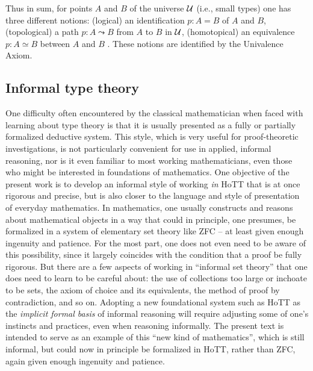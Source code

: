 {Thus in sum, for points  $A$ and $B$ of the universe $\mathcal{U}$ (i.e., small types) one has three different notions: (logical) an identification $p:A=B$ of $A$ and $B$, (topological) a path $p:A \leadsto B$ from $A$ to $B$ in $\mathcal{U}$, (homotopical) an equivalence $p:A\simeq B$ between $A$ and $B$ .  These notions are identified by the Univalence Axiom.


\subsection*{Informal type theory}

One difficulty often encountered by the classical mathematician when faced with learning about type theory is that it is usually presented as a fully or partially formalized deductive system.  This style, which is very useful for proof-theoretic investigations, is not particularly convenient for use in applied, informal reasoning, nor is it even familiar to most working mathematicians, even those who might be interested in foundations of mathematics.  One objective of the present work is to develop an informal style of working \emph{in} HoTT that is at once rigorous and precise, but is also closer to the language and style of presentation of everyday mathematics.    In mathematics, one usually constructs and reasons about mathematical objects in a way that could in principle, one presumes, be formalized in a system of elementary set theory like ZFC -- at least given enough ingenuity and patience.  For the most part, one does not even need to be aware of this possibility, since it largely coincides with the condition that a proof be fully rigorous.  But there are a few aspects of working in ``informal set theory'' that one does need to learn to be careful about: the use of collections too large or inchoate to  be sets, the axiom of choice and its equivalents,  the method of proof by contradiction, and so on.  Adopting a new foundational system such as HoTT as the \emph{implicit formal basis} of informal reasoning will require adjusting some of one's instincts and practices, even when reasoning informally.  The present text is intended to serve as an example of this ``new kind of mathematics'', which is still informal, but could now in principle be formalized in HoTT, rather than ZFC, again given enough ingenuity and patience.

}
